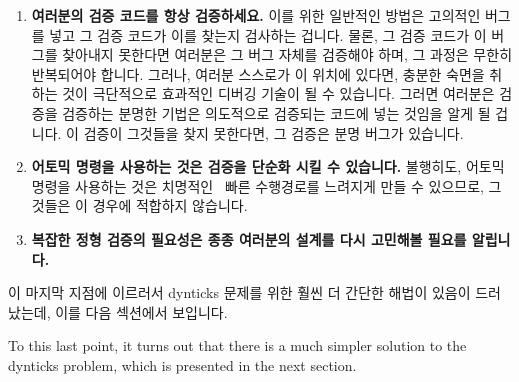 \begin{enumerate}
\item	{\bf 여러분의 검증 코드를 항상 검증하세요.}
	이를 위한 일반적인 방법은 고의적인 버그를 넣고 그 검증 코드가 이를
	찾는지 검사하는 겁니다.
	물론, 그 검증 코드가 이 버그를 찾아내지 못한다면 여러분은 그 버그
	자체를 검증해야 하며, 그 과정은 무한히 반복되어야 합니다.
	그러나, 여러분 스스로가 이 위치에 있다면, 충분한 숙면을 취하는 것이
	극단적으로 효과적인 디버깅 기술이 될 수 있습니다.
	그러면 여러분은 검증을 검증하는 분명한 기법은 의도적으로 검증되는
	코드에 넣는 것임을 알게 될 겁니다.
	이 검증이 그것들을 찾지 못한다면, 그 검증은 분명 버그가 있습니다.
\item	{\bf 어토믹 명령을 사용하는 것은 검증을 단순화 시킬 수 있습니다.}
	불행히도,  어토믹 명령을 사용하는 것은 치명적인 \IRQ\ 빠른
	수행경로를 느려지게 만들 수 있으므로, 그것들은 이 경우에 적합하지
	않습니다.
\item	{\bf 복잡한 정형 검증의 필요성은 종종 여러분의 설계를 다시 고민해볼
	필요를 알립니다.}

\iffalse

\item	{\bf Always verify your verification code.}
	The usual way to do this is to insert a deliberate bug
	and verify that the verification code catches it.  Of course,
	if the verification code fails to catch this bug, you may also
	need to verify the bug itself, and so on, recursing infinitely.
	However, if you find yourself in this position,
	getting a good night's sleep
	can be an extremely effective debugging technique.
	You will then see that the obvious verify-the-verification
	technique is to deliberately insert bugs in the code being
	verified.
	If the verification fails to find them, the verification clearly
	is buggy.
\item	{\bf Use of atomic instructions can simplify verification.}
	Unfortunately, use of the \co{cmpxchg} atomic instruction
	would also slow down the critical \IRQ\ fastpath, so they
	are not appropriate in this case.
\item	{\bf The need for complex formal verification often indicates
	a need to re-think your design.}

\fi

\end{enumerate}

이 마지막 지점에 이르러서 dynticks 문제를 위한 훨씬 더 간단한 해법이 있음이
드러났는데, 이를 다음 섹션에서 보입니다.

\iffalse

To this last point, it turns out that there is a much simpler solution to
the dynticks problem, which is presented in the next section.

